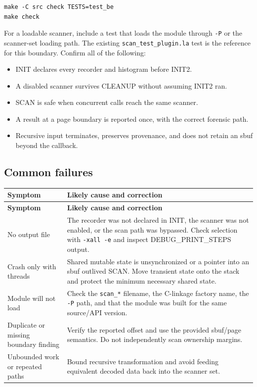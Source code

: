 \documentclass[11pt]{article}
\newcommand{\code}[1]{\texttt{#1}}
\begin{document}
\begin{Verbatim}
make -C src check TESTS=test_be
make check
\end{Verbatim}

For a loadable scanner, include a test that loads the module through \code{-P}
or the scanner-set loading path. The existing \code{scan\_test\_plugin.la}
test is the reference for this boundary. Confirm all of the following:

\begin{itemize}
\item INIT declares every recorder and histogram before INIT2.
\item A disabled scanner survives CLEANUP without assuming INIT2 ran.
\item SCAN is safe when concurrent calls reach the same scanner.
\item A result at a page boundary is reported once, with the correct
  forensic path.
\item Recursive input terminates, preserves provenance, and does not retain
  an sbuf beyond the callback.
\end{itemize}

\subsection{Common failures}

\begin{longtable}{|p{.30\linewidth}|p{.60\linewidth}|}
\hline
\textbf{Symptom} & \textbf{Likely cause and correction} \\
\hline
\endfirsthead
\hline
\textbf{Symptom} & \textbf{Likely cause and correction} \\
\hline
\endhead
No output file & The recorder was not declared in INIT, the scanner was not
enabled, or the scan path was bypassed. Check selection with \code{-xall -e}
and inspect DEBUG\_PRINT\_STEPS output. \\
\hline
Crash only with threads & Shared mutable state is unsynchronized or a pointer
into an sbuf outlived SCAN. Move transient state onto the stack and protect
the minimum necessary shared state. \\
\hline
Module will not load & Check the \code{scan\_*} filename, the C-linkage
factory name, the \code{-P} path, and that the module was built for the same
source/API version. \\
\hline
Duplicate or missing boundary finding & Verify the reported offset and use the
provided sbuf/page semantics. Do not independently scan ownership margins. \\
\hline
Unbounded work or repeated paths & Bound recursive transformation and avoid
feeding equivalent decoded data back into the scanner set. \\
\hline
\end{longtable}
\end{document}
